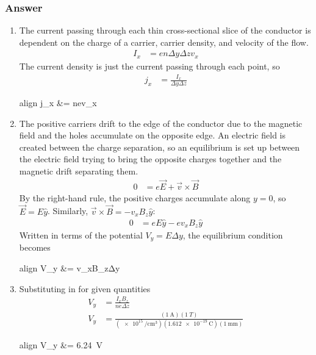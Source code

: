 \subsubsection{Answer}

\begin{enumerate}
	\item
		The current passing through each thin cross-sectional slice of the
		conductor is dependent on the charge of a carrier, carrier density,
		and velocity of the flow.
		\begin{align*}
			I_x &= enΔyΔzv_x
		\end{align*}
		The current density is just the current passing through each point, so
		\begin{align*}
			j_x &= \frac{I_x}{ΔyΔz}
		\end{align*}
		\begin{empheq}[box=\fbox]{align}
			j_x &= nev_x
		\end{empheq}
	\item
		The positive carriers drift to the edge of the conductor due to the
		magnetic field and the holes accumulate on the opposite edge. An
		electric field is created between the charge separation, so an
		equilibrium is set up between the electric field trying to bring the
		opposite charges together and the magnetic drift separating them.
		\begin{align*}
			0 &= e\vec E + \vec v × \vec B
		\end{align*}
		By the right-hand rule, the positive charges accumulate along $y=0$, so
		$\vec E = E \hat y$. Similarly, $\vec v × \vec B = -v_xB_z\hat y$:
		\begin{align*}
			0 &= eE\hat y - ev_xB_z\hat y
		\end{align*}
		Written in terms of the potential $V_y = EΔy$, the equilibrium
		condition becomes
		\begin{empheq}[box=\fbox]{align}
			V_y &= v_xB_zΔy
		\end{empheq}
	\item
		Substituting in for given quantities
		\begin{align*}
			V_y &= \frac{I_x B_z}{neΔz} \\
			V_y &= \frac{(\SI{1}{\A})(\SI{1}{T})}
				{(\SI[per-mode=reciprocal]{e15}{\per\cm\cubed})
				 (\SI{1.612e-19}{\coulomb})(\SI{1}{\mm})}
		\end{align*}
		\begin{empheq}[box=\fbox]{align}
			V_y &= \SI{6.24}{\V}
		\end{empheq}
\end{enumerate}
